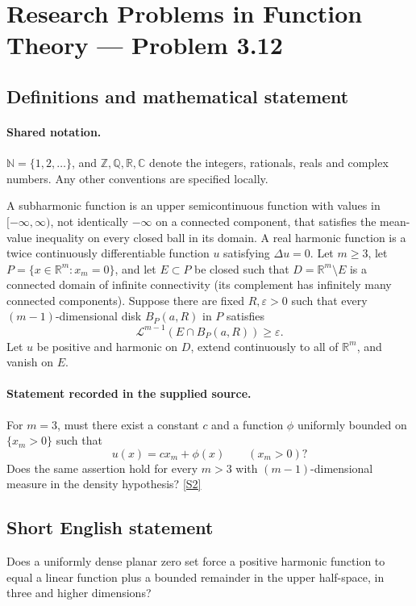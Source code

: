\documentclass[11pt]{article}
\newcommand{\sref}[2]{\hyperlink{source:#1:#2}{[S#2]}}
\begin{document}
\section{Research Problems in Function Theory — Problem 3.12}\label{statement}

\subsection{Definitions and mathematical statement}

\paragraph{Shared notation.}$\mathbb N=\{1,2,\ldots\}$, and $\mathbb Z,\mathbb Q,\mathbb R,\mathbb C$ denote the integers, rationals, reals and complex numbers. Any other conventions are specified locally.


A subharmonic function is an upper semicontinuous function with values in $[-\infty,\infty)$, not identically $-\infty$ on a connected component, that satisfies the mean-value inequality on every closed ball in its domain. A real harmonic function is a twice continuously differentiable function $u$ satisfying $\Delta u=0$. Let $m\geq3$, let $P=\{x\in\mathbb R^m:x_m=0\}$, and let $E\subset P$ be closed such that $D=\mathbb R^m\setminus E$ is a connected domain of infinite connectivity (its complement has infinitely many connected components). Suppose there are fixed $R,\varepsilon>0$ such that every $(m-1)$-dimensional disk $B_P(a,R)$ in $P$ satisfies
\[\mathcal L^{m-1}(E\cap B_P(a,R))\geq\varepsilon.\]
Let $u$ be positive and harmonic on $D$, extend continuously to all of $\mathbb R^m$, and vanish on $E$.
\paragraph{Statement recorded in the supplied source.}
For $m=3$, must there exist a constant $c$ and a function $\phi$ uniformly bounded on $\{x_m>0\}$ such that
\[u(x)=c x_m+\phi(x)\qquad(x_m>0)?\]
Does the same assertion hold for every $m>3$ with $(m-1)$-dimensional measure in the density hypothesis? \sref{statement}{2}
\subsection{Short English statement}
Does a uniformly dense planar zero set force a positive harmonic function to equal a linear function plus a bounded remainder in the upper half-space, in three and higher dimensions?
\end{document}
